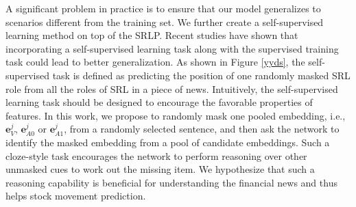 \documentclass{article}
\begin{document}
A significant problem in practice is to ensure that our model generalizes to scenarios different from the training set. We further create a self-supervised learning method on top of the SRLP. Recent studies \cite{mohseni2020self,hendrycks2019selfsupervised} have shown that incorporating a self-supervised learning task along with the supervised training task could lead to better generalization. As shown in Figure \ref{yyds}, the self-supervised task is defined as predicting the position of one randomly masked SRL role from all the roles of SRL in a piece of news. Intuitively, the self-supervised learning task should be designed to encourage the favorable properties of features. In this work, we propose to randomly mask one pooled embedding, i.e., $\mathbf{e}_{V}^j$,  $\mathbf{e}_{A0}^j$ or $\mathbf{e}_{A1}^j$, from a randomly selected sentence, and then ask the network to identify the masked embedding from a pool of candidate embeddings. Such a cloze-style task encourages the network to perform reasoning over other unmasked cues to work out the missing item. We hypothesize that such a reasoning capability is beneficial for understanding the financial news and thus helps stock movement prediction. 
\end{document}
